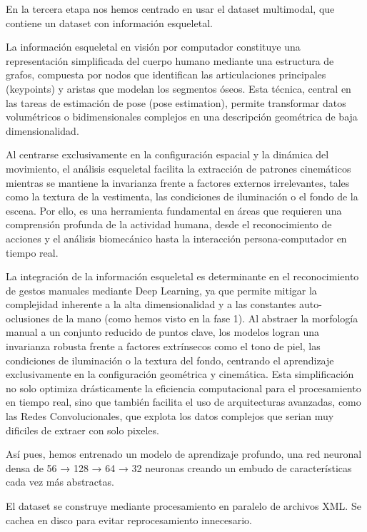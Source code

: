 \documentclass[10pt,a4paper,twocolumn,twoside]{article}
\begin{document}
En la tercera etapa nos hemos centrado en usar el dataset multimodal, que contiene un dataset con información esqueletal. 

La información esqueletal en visión por computador constituye una representación simplificada del cuerpo humano mediante una estructura de grafos, 
compuesta por nodos que identifican las articulaciones principales (keypoints) y aristas que modelan los segmentos óseos. 
Esta técnica, central en las tareas de estimación de pose (pose estimation), permite transformar datos volumétricos o bidimensionales complejos en una descripción geométrica de baja dimensionalidad. 

Al centrarse exclusivamente en la configuración espacial y la dinámica del movimiento, el análisis esqueletal facilita la extracción de patrones cinemáticos mientras se mantiene la invarianza frente a factores externos irrelevantes, 
tales como la textura de la vestimenta, las condiciones de iluminación o el fondo de la escena. Por ello, es una herramienta fundamental en áreas que requieren una comprensión profunda de la actividad humana, desde el reconocimiento de acciones y el análisis 
biomecánico hasta la interacción persona-computador en tiempo real.

La integración de la información esqueletal es determinante en el reconocimiento de gestos manuales mediante Deep Learning, ya que permite mitigar la complejidad inherente a la alta dimensionalidad 
y a las constantes auto-oclusiones de la mano (como hemos visto en la fase 1). Al abstraer la morfología manual a un conjunto reducido de puntos clave, los modelos logran una invarianza robusta frente a factores extrínsecos como el tono de piel, 
las condiciones de iluminación o la textura del fondo, 
centrando el aprendizaje exclusivamente en la configuración geométrica y cinemática. 
Esta simplificación no solo optimiza drásticamente la eficiencia computacional para el procesamiento en tiempo real, 
sino que también facilita el uso de arquitecturas avanzadas, como las Redes Convolucionales, que explota los datos complejos que serian muy dificiles de extraer con solo pixeles.

Así pues, hemos entrenado un modelo de aprendizaje profundo, una red neuronal densa de 56 → 128 → 64 → 32 neuronas creando un embudo de características cada vez más abstractas.

El dataset se construye mediante procesamiento en paralelo de archivos XML. Se cachea en disco para evitar reprocesamiento innecesario.
\end{document}
